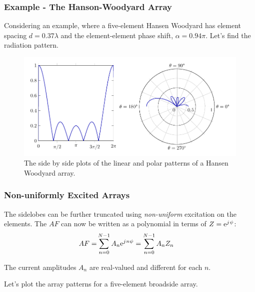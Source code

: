 \documentclass[10pt]{beamer}
\newcommand{\e}{\mathrm{e}} %
\renewcommand{\j}{{j}\mkern1mu} %
\begin{document}
\begin{frame}
    \frametitle{Example - The Hanson-Woodyard Array}
Considering an example, where a five-element Hansen Woodyard has element spacing $d  = 0.37 \lambda$ and the element-element phase shift, $\alpha = 0.94 \pi$. Let's find the radiation pattern.

\begin{figure}[h!]
    \centering
    \includegraphics[width = .9 \textwidth]{Hansen Woodyard.pdf}
    \caption{The side by side plots of the linear and polar patterns of a Hansen Woodyard array.}
\end{figure}
\end{frame}


\begin{frame}
    \frametitle{Non-uniformly Excited Arrays}
The sidelobes can be further truncated using \textit{non-uniform} excitation on the elements. The $AF$ can now be written as a polynomial in terms of $Z = \e^{\j \psi}$:
\begin{align*}
    AF {}=& \sum_{n = 0}^{N-1} A_n \e^{\j n \psi} = \sum_{n = 0}^{N-1} A_n Z_n
\end{align*}

The current amplitudes $A_n$ are real-valued and different for each $n$.

Let's plot the array patterns for a five-element broadside array.

\end{frame}
\end{document}

